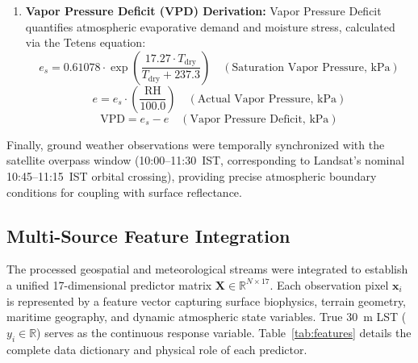 \documentclass[a4paper,fleqn]{cas-sc}
\begin{document}
\begin{enumerate}[1.]
    \begin{equation}
        v = -W_s \cdot \cos\left( \frac{\theta \cdot \pi}{180} \right) \quad \text{[Meridional Velocity: South to North (+)]}
        \label{eq:wind_v}
    \end{equation}
    Where wind speed was unmeasured, a baseline coastal sea-breeze speed of $W_s = 3.0\text{ m/s}$ was utilized to isolate directional vector variations.
    \item \textbf{Vapor Pressure Deficit (VPD) Derivation:} Vapor Pressure Deficit quantifies atmospheric evaporative demand and moisture stress, calculated via the Tetens equation:
    \begin{equation}
        e_s = 0.61078 \cdot \exp\left( \frac{17.27 \cdot T_{\text{dry}}}{T_{\text{dry}} + 237.3} \right) \quad (\text{Saturation Vapor Pressure, kPa})
        \label{eq:tetens_es}
    \end{equation}
    \begin{equation}
        e = e_s \cdot \left( \frac{\text{RH}}{100.0} \right) \quad (\text{Actual Vapor Pressure, kPa})
        \label{eq:actual_e}
    \end{equation}
    \begin{equation}
        \text{VPD} = e_s - e \quad (\text{Vapor Pressure Deficit, kPa})
        \label{eq:vpd}
    \end{equation}
\end{enumerate}

Finally, ground weather observations were temporally synchronized with the satellite overpass window (10:00--11:30~IST, corresponding to Landsat's nominal 10:45--11:15~IST orbital crossing), providing precise atmospheric boundary conditions for coupling with surface reflectance.

\subsection{Multi-Source Feature Integration}
\label{subsec:feature_matrix}

The processed geospatial and meteorological streams were integrated to establish a unified 17-dimensional predictor matrix $\mathbf{X} \in \mathbb{R}^{N \times 17}$. Each observation pixel $\mathbf{x}_i$ is represented by a feature vector capturing surface biophysics, terrain geometry, maritime geography, and dynamic atmospheric state variables. True 30~m LST ($y_i \in \mathbb{R}$) serves as the continuous response variable. Table~\ref{tab:features} details the complete data dictionary and physical role of each predictor.
\end{document}
